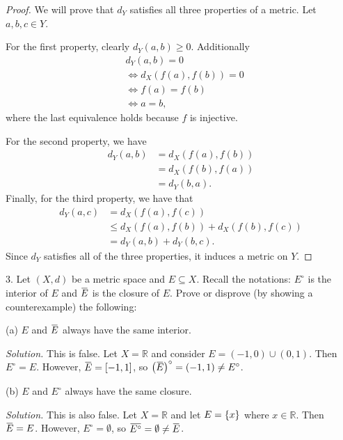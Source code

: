 \documentclass{article}
\newcommand{\R}{\mathbb{R}}
\newcommand*\clos[1]{\mkern 1.5mu\overline{\mkern-1.5mu#1\mkern-1.5mu}\mkern 1.5mu}
\begin{document}
\begin{proof}

We will prove that $d_Y$ satisfies all three properties of a metric. Let
$a, b, c \in Y$.

For the first property, clearly $d_Y(a, b) \geq 0$. Additionally
%
\begin{align*}
    &d_Y(a, b) = 0 \\
    &\iff d_X(f(a), f(b)) = 0 \\
    &\iff f(a) = f(b) \\
    &\iff a = b
    ,
\end{align*}
%
where the last equivalence holds because $f$ is injective.

For the second property, we have
%
\begin{align*}
    d_Y(a, b) &= d_X(f(a), f(b)) \\
              &= d_X(f(b), f(a)) \\
              &= d_Y(b, a)
              .
\end{align*}
%
Finally, for the third property, we have that
%
\begin{align*}
    d_Y(a, c) &= d_X(f(a), f(c)) \\
              &\leq d_X(f(a), f(b)) + d_X(f(b), f(c)) \\
              &= d_Y(a, b) + d_Y(b, c)
              .
\end{align*}
%
Since $d_Y$ satisfies all of the three properties, it induces a metric
on $Y$.

\end{proof}

\newpage

3. Let $(X, d)$ be a metric space and $E \subseteq X$. Recall the
   notations: $E^\circ$ is the interior of $E$ and $\clos{E}$ is the
   closure of $E$. Prove or disprove (by showing a counterexample) the
   following:

   (a) $E$ and $\clos{E}$ always have the same interior.

\textit{Solution.}
This is false. Let $X = \R$ and consider $E = (-1, 0) \cup (0, 1)$. Then
$E^\circ = E$. However, $\clos{E} = [-1, 1]$, so
$\del[1]{\clos{E}}^\circ = (-1, 1) \neq E^\circ$.

(b) $E$ and $E^\circ$ always have the same closure.

\textit{Solution.}
This is also false. Let $X = \R$ and let $E = \cbr{x}$ where $x \in \R$.
Then $\clos{E} = E$. However, $E^\circ = \emptyset$, so $\clos{E^\circ}
= \emptyset \neq \clos{E}$.
\end{document}
